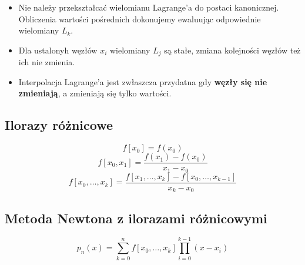 \documentclass[../mn-notatki.tex]{subfiles}
\begin{document}
\begin{itemize}
    \item Nie należy przekształcać wielomianu Lagrange'a do postaci kanonicznej.
    Obliczenia wartości pośrednich dokonujemy ewaluując odpowiednie wielomiany
    $L_k$.
    \item Dla ustalonyh węzłów $x_i$ wielomiany $L_j$ są stałe, zmiana
    kolejności węzłów też ich nie zmienia.
    \item Interpolacja Lagrange'a jest zwłaszcza przydatna gdy \textbf{węzły
    się nie zmieniają}, a zmieniają się tylko wartości.
\end{itemize}

\subsection{Ilorazy różnicowe}

\begin{tcolorbox}
\[
f[x_0] = f(x_0)
\]
\[
f[x_0,x_1] = \frac{f(x_1) - f(x_0)}{x_1 - x_0}
\]
\[
f[x_0,\ldots, x_k] = \frac{f[x_1, \ldots, x_k] - f[x_0, \ldots, x_{k-1}]}{x_k - x_0}
\]
\end{tcolorbox}

\subsection{Metoda Newtona z ilorazami różnicowymi}

\begin{tcolorbox}
\[
p_n(x) = \sum_{k=0}^{n} f[x_0,\ldots,x_k] \prod_{i=0}^{k-1} (x-x_i)
\]
\end{tcolorbox}
\end{document}
